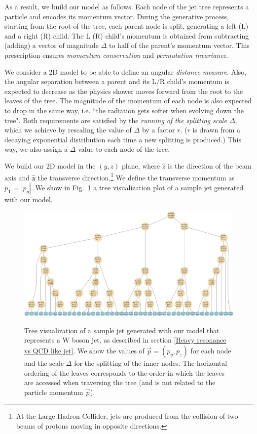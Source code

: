 \documentclass[12pt]{article}
\begin{document}
As a result, we build our model as follows. Each node of the jet tree represents a particle and encodes its momentum vector. During the generative process, starting from the root of the tree, each parent node is split, generating a left (L) and a right (R) child. The L (R) child's momentum is obtained from subtracting (adding) a vector of magnitude $\Delta$ to half of the parent's momentum vector. This prescription ensures {\it momentum conservation} and {\it permutation invariance}.

We consider a 2D model to be able to define an angular {\it distance measure}. Also, the angular separation between a parent and its L/R child's momentum is expected to decrease as the physics shower moves forward from the root to the leaves of the tree. The magnitude of the momentum of each node is also expected to drop in the same way, i.e. ``the radiation gets softer when evolving down the tree".
Both requirements are satisfied by the {\it running of the splitting scale $\Delta$}, which we achieve by rescaling the value of $\Delta$ by a factor $r$. ($r$ is drawn from a decaying exponential distribution each time a new splitting is produced.)  
This way, we also assign a $\Delta$ value to each node of the tree. 


We build our 2D model in the $(y,z)$ plane, where $\hat{z}$ is the direction of the beam axis and $\hat{y}$ the transverse direction.\footnote{At the Large Hadron Collider, jets are produced from the collision of two beams of protons moving in opposite directions.} 
We define the transverse momentum as $p_{\text{T}} =|p_y|$. We show in Fig.~\ref{fig:1DTree} a tree visualization plot of a sample jet generated with our model.

\begin{figure}
{
  \includegraphics[width=\linewidth]{plots/figTruth_jet9.pdf}
}
\caption{\small{Tree visualization of a sample jet generated with our model that represents a W boson jet, as described in section \ref{Heavy resonance vs QCD like jet}. We show the values of $\vec{p} =(p_y,p_z)$ for each node and the scale $\Delta$ for the splitting of the inner nodes. The horizontal ordering of the leaves corresponds to the order in which the leaves are accessed when traversing the tree (and is not related to the particle momentum $\vec{p}$).
}}
\label{fig:1DTree}
\end{figure}
\end{document}
